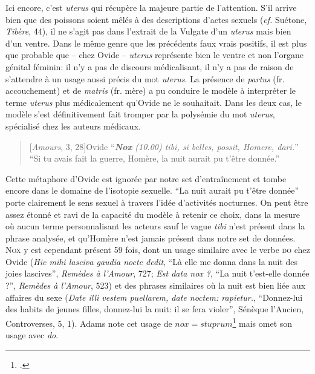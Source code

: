 Ici encore, c'est \textit{uterus} qui récupère la majeure partie de l'attention. S'il arrive bien que des poissons soient mêlés à des descriptions d'actes sexuels (\textit{cf.} Suétone, \textit{Tibère}, 44), il ne s'agit pas dans l'extrait de la Vulgate d'un \textit{uterus} mais bien d'un ventre. Dans le même genre que les précédents faux vrais positifs, il est plus que probable que -- chez Ovide -- \textit{uterus} représente bien le ventre et non l'organe génital féminin: il n'y a pas de discours médicalisant, il n'y a pas de raison de s'attendre à un usage aussi précis du mot \textit{uterus}. La présence de \textit{partus} (fr. accouchement) et de \textit{matris} (fr. mère) a pu conduire le modèle à interpréter le terme \textit{uterus} plus médicalement qu'Ovide ne le souhaitait. Dans les deux cas, le modèle s'est définitivement fait tromper par la polysémie du mot \textit{uterus}, spécialisé chez les auteurs médicaux.

\begin{quote}[\textit{Amours}, 3, 28]{Ovide}
    \enquote{\textit{\textbf{Nox} (10.00) tibi, si belles, possit, Homere, dari.}} \\
    \enquote{Si tu avais fait la guerre, Homère, la nuit aurait pu t'être donnée.}
\end{quote}

Cette métaphore d'Ovide est ignorée par notre set d'entraînement et tombe encore dans le domaine de l'isotopie sexuelle. ``La nuit aurait pu t'être donnée'' porte clairement le sens sexuel à travers l'idée d'activités nocturnes. On peut être assez étonné et ravi de la capacité du modèle à retenir ce choix, dans la mesure où aucun terme personnalisant les acteurs sauf le vague \textit{tibi} n'est présent dans la phrase analysée, et qu'Homère n'est jamais présent dans notre set de données. \textsc{Nox} y est cependant présent 59 fois, dont un usage similaire avec le verbe \textsc{do} chez Ovide (\textit{Hic mihi lasciva gaudia nocte dedit}, ``Là elle me donna dans la nuit des joies lascives'', \textit{Remèdes à l'Amour}, 727; \textit{Est data nox ?}, ``La nuit t'est-elle donnée ?'', \textit{Remèdes à l'Amour}, 523) et des phrases similaires où la nuit est bien liée aux affaires du sexe (\textit{Date illi vestem puellarem, date noctem: rapietur.}, ``Donnez-lui des habits de jeunes filles, donnez-lui la nuit: il se fera violer'', Sénèque l'Ancien, Controverses, 5, 1). Adams note cet usage de $nox=stuprum$\footcite[p.178]{adams} mais omet son usage avec \textit{do}.

\starbreak

